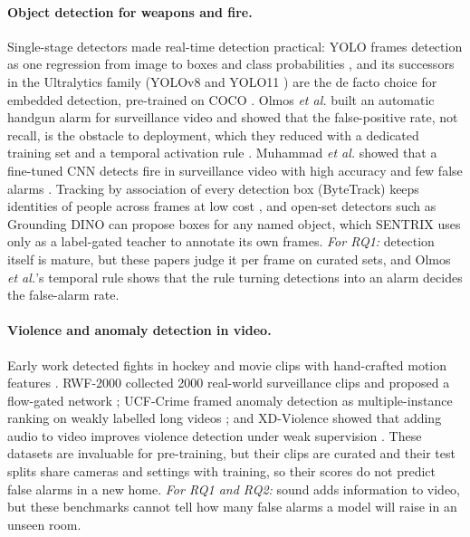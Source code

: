 \paragraph{Object detection for weapons and fire.} Single-stage detectors made real-time detection practical: YOLO frames detection as one regression from image to boxes and class probabilities \cite{redmon2016yolo}, and its successors in the Ultralytics family (YOLOv8 \cite{ultralytics_yolov8} and YOLO11 \cite{ultralytics_yolo11}) are the de facto choice for embedded detection, pre-trained on COCO \cite{lin2014coco}. Olmos \emph{et al.} built an automatic handgun alarm for surveillance video and showed that the false-positive rate, not recall, is the obstacle to deployment, which they reduced with a dedicated training set and a temporal activation rule \cite{olmos2018handgun}. Muhammad \emph{et al.} showed that a fine-tuned CNN detects fire in surveillance video with high accuracy and few false alarms \cite{muhammad2018fire}. Tracking by association of every detection box (ByteTrack) keeps identities of people across frames at low cost \cite{zhang2022bytetrack}, and open-set detectors such as Grounding DINO \cite{liu2024groundingdino} can propose boxes for any named object, which SENTRIX uses only as a label-gated teacher to annotate its own frames. \emph{For RQ1:} detection itself is mature, but these papers judge it per frame on curated sets, and Olmos \emph{et al.}'s temporal rule shows that the rule turning detections into an alarm decides the false-alarm rate.

\paragraph{Violence and anomaly detection in video.} Early work detected fights in hockey and movie clips with hand-crafted motion features \cite{bermejo2011violence}. RWF-2000 collected 2000 real-world surveillance clips and proposed a flow-gated network \cite{cheng2021rwf}; UCF-Crime framed anomaly detection as multiple-instance ranking on weakly labelled long videos \cite{sultani2018anomaly}; and XD-Violence showed that adding audio to video improves violence detection under weak supervision \cite{wu2020xdviolence}. These datasets are invaluable for pre-training, but their clips are curated and their test splits share cameras and settings with training, so their scores do not predict false alarms in a new home. \emph{For RQ1 and RQ2:} sound adds information to video, but these benchmarks cannot tell how many false alarms a model will raise in an unseen room.

